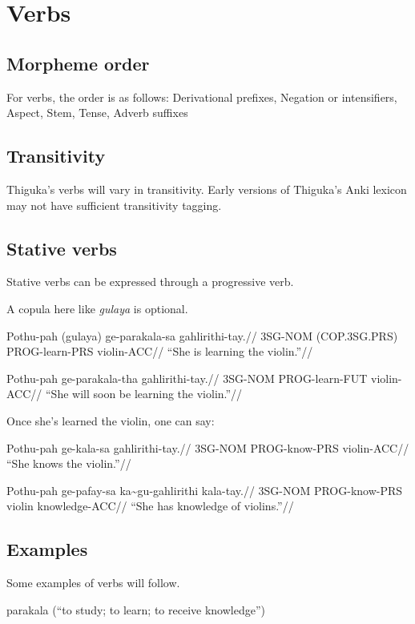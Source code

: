 

\section{Verbs}
\subsection{Morpheme order}
For verbs, the order is as follows: Derivational prefixes, Negation or intensifiers, Aspect, Stem, Tense, Adverb suffixes

\subsection{Transitivity}
Thiguka's verbs will vary in transitivity. Early versions of Thiguka's Anki lexicon may not have sufficient transitivity tagging.

\subsection{Stative verbs}
Stative verbs can be expressed through a progressive verb.

A copula here like \textit{gulaya} is optional.

\ex
\begingl
    \gla Pothu-pah (gulaya)      ge-parakala-sa gahlirithi-tay.//
    \glb 3SG-NOM   (COP.3SG.PRS) PROG-learn-PRS violin-ACC//
    \glft ``She is learning the violin.''//
\endgl
\xe

\ex
\begingl
    \gla Pothu-pah ge-parakala-tha gahlirithi-tay.//
    \glb 3SG-NOM   PROG-learn-FUT violin-ACC//
    \glft ``She will soon be learning the violin.''//
\endgl
\xe

Once she's learned the violin, one can say:

\ex
\begingl
    \gla Pothu-pah ge-kala-sa    gahlirithi-tay.//
    \glb 3SG-NOM   PROG-know-PRS violin-ACC//
    \glft ``She knows the violin.''//
\endgl
\xe

\ex
\begingl
    \gla Pothu-pah ge-pafay-sa    ka\~{}gu-gahlirithi kala-tay.//
    \glb 3SG-NOM   PROG-know-PRS \agradj{}violin knowledge-ACC//
    \glft ``She has knowledge of violins.''//
\endgl
\xe


\subsection{Examples}
Some examples of verbs will follow.

parakala (``to study; to learn; to receive knowledge'')

